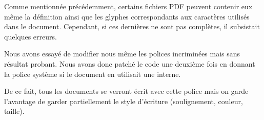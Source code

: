 
Comme mentionnée précédemment, certains fichiers PDF peuvent contenir eux 
même la définition ainsi que les glyphes correspondants aux caractères utilisés dans 
le document. Cependant, si ces dernières ne sont pas complètes, il subsistait
quelques erreurs.

Nous avons essayé de modifier nous même les polices incriminées mais 
sans résultat probant. Nous avons donc patché le code une deuxième fois 
en donnant la police système si le document en utilisait une interne.

De ce fait, tous les documents se verront écrit avec cette police mais 
on garde l'avantage de garder partiellement le style d'écriture 
(soulignement, couleur, taille).

